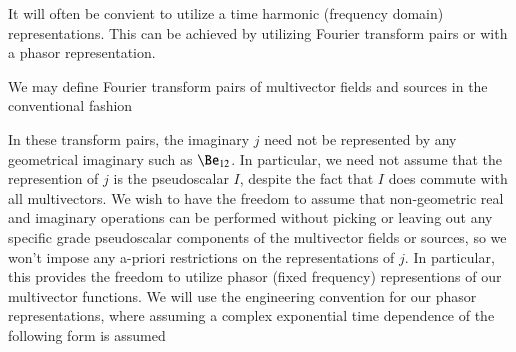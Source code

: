 %
%
It will often be convient to utilize a time harmonic (frequency domain) representations.
This can be achieved by utilizing Fourier transform pairs or with a phasor representation.

We may define Fourier transform pairs of multivector fields and sources in the conventional fashion


In these transform pairs, the imaginary \( j \) need not be represented by any geometrical imaginary such as \( \Be_{12} \).
In particular, we need not assume that the represention of \( j \) is the
 pseudoscalar \( I \), despite the fact that \( I \) does commute with all  multivectors.
We wish to have the freedom to
assume that non-geometric real and imaginary operations can be performed without picking or leaving out any specific grade pseudoscalar components of the multivector fields or sources, so we won't impose any a-priori restrictions on the representations of \( j \).
In particular, this provides the freedom to utilize phasor (fixed frequency) representions of our multivector functions.
We will use the engineering convention for our
phasor representations, where assuming a complex exponential time dependence of the following form is assumed


